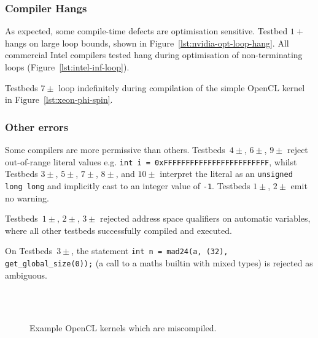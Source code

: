 \subsubsection{Compiler Hangs}

As expected, some compile-time defects are optimisation sensitive. Testbed $1+$ hangs on large loop bounds, shown in Figure~\ref{lst:nvidia-opt-loop-hang}. All commercial Intel compilers  tested hang during optimisation of non-terminating loops (Figure~\ref{lst:intel-inf-loop}).

Testbeds $7\pm$ loop indefinitely during compilation of the simple OpenCL kernel in Figure~\ref{lst:xeon-phi-spin}.


\subsubsection{Other errors}

Some compilers are more permissive than others. Testbeds~$4\pm$, $6\pm$, $9\pm$ reject out-of-range literal values e.g. \texttt{int i = 0xFFFFFFFFFFFFFFFFFFFFFFFF}, whilst Testbeds $3\pm$, $5\pm$, $7\pm$, $8\pm$, and $10\pm$ interpret the literal as an \texttt{unsigned long long} and implicitly cast to an integer value of \texttt{-1}. Testbeds $1\pm$, $2\pm$ emit no warning.

Testbeds~$1\pm$, $2\pm$, $3\pm$ rejected address space qualifiers on automatic variables, where all other testbeds successfully compiled and executed.

On Testbeds~$3\pm$, the statement \texttt{int n = mad24(a, (32), get\_global\_size(0));} (a call to a maths builtin with mixed types) is rejected as ambiguous.



\begin{figure}
  \centering %
  \\%
  \\%
  \caption[Example kernels which are miscompiled]{%
    Example OpenCL kernels which are miscompiled.%
  }%
\end{figure}

